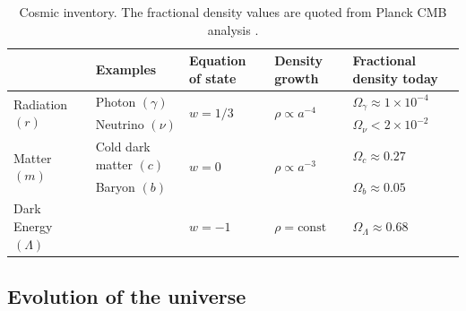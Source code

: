 \begin{table}[h]
	\caption{Cosmic inventory. The fractional density values are quoted from Planck CMB analysis \cite{PlanckCollaboration2018Parameters}.}
	\centering
	\label{table:cosmic_inventory}
	\renewcommand{\arraystretch}{1.5} 
	\begin{tabular}{m{} m{} m{}<{\centering} m{}<{\centering} m{}<{\centering} }
		\toprule
		& Examples & Equation \newline of state & Density growth & Fractional density today \\ 
		
		\midrule
		\multirow{2}{*}{Radiation $(r)$} & Photon $(\gamma)$ & \multirow{2}{*}{$w = 1/3$} & \multirow{2}{*}{$\rho \propto a^{-4}$} & $\Omega_{\gamma} \approx 1 \times 10^{-4}$ \\
		& Neutrino $(\nu)$ & & & $\Omega_{\nu} < 2 \times 10^{-2}$ \\
		
		\midrule	
		\multirow{2}{*}{Matter $(m)$} & Cold dark \newline matter $(c)$ & \multirow{2}{*}{$w = 0$} & \multirow{2}{*}{$\rho \propto a^{-3}$} & $\Omega_{c} \approx 0.27$ \\
		& Baryon $(b)$ & & & $\Omega_{b} \approx 0.05$ \\
		
		\midrule
		Dark Energy $(\Lambda)$ & & $w=-1$ & $\rho=\text{const}$  & $\Omega_\Lambda \approx 0.68$\\
		\bottomrule
	\end{tabular}
\end{table}


\subsection{Evolution of the universe}

